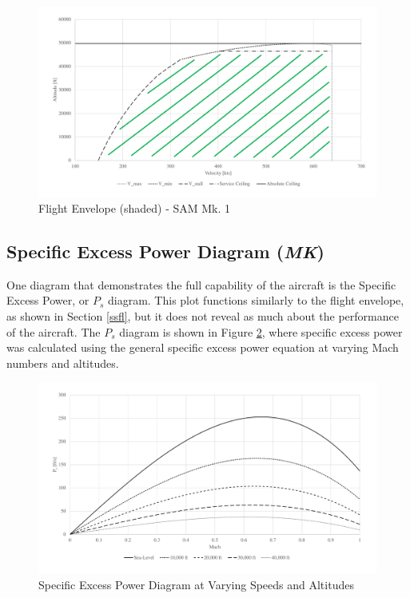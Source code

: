 \begin{figure}[!h]
    \centering
    \includegraphics[width=1.0\textwidth]{Photos/Flight_Envelope.pdf}
    \caption{Flight Envelope (shaded) -  SAM Mk. 1}
    \label{flyenv}
 \end{figure}
\clearpage

\subsection{Specific Excess Power Diagram (\textit{MK})}
One diagram that demonstrates the full capability of the aircraft is the Specific Excess Power, or $P_{s}$ diagram. This plot functions similarly to the flight envelope, as shown in Section \ref{ssfl}, but it does not reveal as much about the performance of the aircraft. The $P_{s}$ diagram is shown in Figure \ref{spexpw}, where specific excess power was calculated using the general specific excess power equation at varying Mach numbers and altitudes.

\begin{figure}[H]
    \centering
    \includegraphics[width=1.0\textwidth]{Photos/Specific_Excess_Power.pdf}
    \caption{Specific Excess Power Diagram at Varying Speeds and Altitudes}
    \label{spexpw}
 \end{figure}
\clearpage

